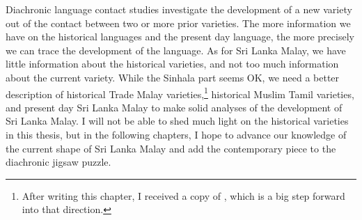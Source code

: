 Diachronic language contact studies investigate the development of a new variety out of the contact between two or more prior varieties. The more information we have on the historical languages and the present day language, the more precisely we can trace the development of the language. As for Sri Lanka Malay, we have little information about the historical varieties, and not too much information about the current variety. While the Sinhala part seems OK, we need a better description of historical Trade Malay varieties,\footnote{After writing this chapter, I received a copy of \citet{Paauw2008phd}, which is a big step forward into that direction.} historical Muslim Tamil varieties, and present day Sri Lanka Malay to make solid analyses of the development of Sri Lanka Malay.
I will not be able to shed much light on the historical varieties in this thesis, but in the following chapters, I hope to advance our knowledge of the current shape of Sri Lanka Malay and  add the contemporary piece to the diachronic jigsaw puzzle.

